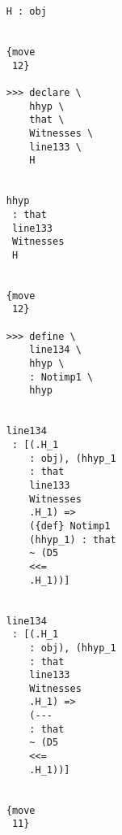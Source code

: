 \documentclass[12pt]{article}
\begin{document}
\begin{verbatim}
                                    H : obj


                                    {move 
                                     12}

                                    >>> declare \
                                        hhyp \
                                        that \
                                        Witnesses \
                                        line133 \
                                        H


                                    hhyp 
                                     : that 
                                     line133 
                                     Witnesses 
                                     H


                                    {move 
                                     12}

                                    >>> define \
                                        line134 \
                                        hhyp \
                                        : Notimp1 \
                                        hhyp


                                    line134 
                                     : [(.H_1 
                                        : obj), (hhyp_1 
                                        : that 
                                        line133 
                                        Witnesses 
                                        .H_1) => 
                                        ({def} Notimp1 
                                        (hhyp_1) : that 
                                        ~ (D5 
                                        <<= 
                                        .H_1))]


                                    line134 
                                     : [(.H_1 
                                        : obj), (hhyp_1 
                                        : that 
                                        line133 
                                        Witnesses 
                                        .H_1) => 
                                        (--- 
                                        : that 
                                        ~ (D5 
                                        <<= 
                                        .H_1))]


                                    {move 
                                     11}


\end{verbatim}
\end{document}

